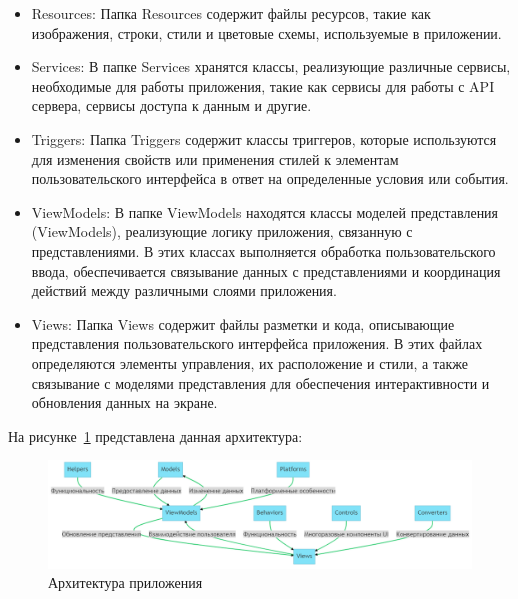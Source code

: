 \begin{itemize}
    \item Resources: Папка Resources содержит файлы ресурсов, такие как изображения, строки, стили и цветовые схемы, используемые в приложении.

    \item Services: В папке Services хранятся классы, реализующие различные сервисы, необходимые для работы приложения, такие как сервисы для работы с API сервера, сервисы доступа к данным и другие.

    \item Triggers: Папка Triggers содержит классы триггеров, которые используются для изменения свойств или применения стилей к элементам пользовательского интерфейса в ответ на определенные условия или события.

    \item ViewModels: В папке ViewModels находятся классы моделей представления (ViewModels), реализующие логику приложения, связанную с представлениями. В этих классах выполняется обработка пользовательского ввода, обеспечивается связывание данных с представлениями и координация действий между различными слоями приложения.

    \item Views: Папка Views содержит файлы разметки и кода, описывающие представления пользовательского интерфейса приложения. В этих файлах определяются элементы управления, их расположение и стили, а также связывание с моделями представления для обеспечения интерактивности и обновления данных на экране.
\end{itemize}

На рисунке~\ref{fig:fig02} представлена данная архитектура:
\begin{figure}
  \includegraphics[scale=0.5]{inc/architecture.png}
  \caption{Архитектура приложения}
  \label{fig:fig02}
\end{figure}

